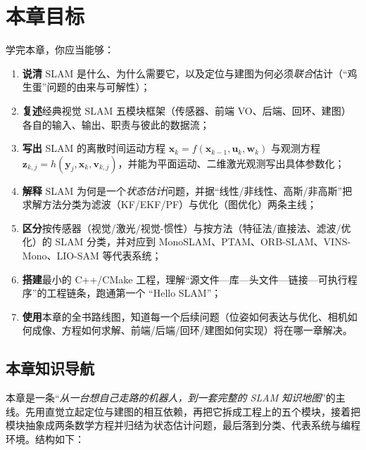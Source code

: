 \section*{本章目标}
学完本章，你应当能够：
\begin{enumerate}
  \item \textbf{说清} SLAM 是什么、为什么需要它，以及定位与建图为何必须\emph{联合}估计（“鸡生蛋”问题的由来与可解性）；
  \item \textbf{复述}经典视觉 SLAM 五模块框架（传感器、前端 VO、后端、回环、建图）各自的输入、输出、职责与彼此的数据流；
  \item \textbf{写出} SLAM 的离散时间运动方程 $\mathbf{x}_k=f(\mathbf{x}_{k-1},\mathbf{u}_k,\mathbf{w}_k)$ 与观测方程 $\mathbf{z}_{k,j}=h(\mathbf{y}_j,\mathbf{x}_k,\mathbf{v}_{k,j})$，并能为平面运动、二维激光观测写出具体参数化；
  \item \textbf{解释} SLAM 为何是一个\emph{状态估计}问题，并据“线性/非线性、高斯/非高斯”把求解方法分类为滤波（KF/EKF/PF）与优化（图优化）两条主线；
  \item \textbf{区分}按传感器（视觉/激光/视觉-惯性）与按方法（特征法/直接法、滤波/优化）的 SLAM 分类，并对应到 MonoSLAM、PTAM、ORB-SLAM、VINS-Mono、LIO-SAM 等代表系统；
  \item \textbf{搭建}最小的 C++/CMake 工程，理解“源文件—库—头文件—链接—可执行程序”的工程链条，跑通第一个 “Hello SLAM”；
  \item \textbf{使用}本章的全书路线图，知道每一个后续问题（位姿如何表达与优化、相机如何成像、方程如何求解、前端/后端/回环/建图如何实现）将在哪一章解决。
\end{enumerate}

\subsection*{本章知识导航}
本章是一条“\emph{从一台想自己走路的机器人，到一套完整的 SLAM 知识地图}”的主线。先用直觉立起定位与建图的相互依赖，再把它拆成工程上的五个模块，接着把模块抽象成两条数学方程并归结为状态估计问题，最后落到分类、代表系统与编程环境。结构如下：

